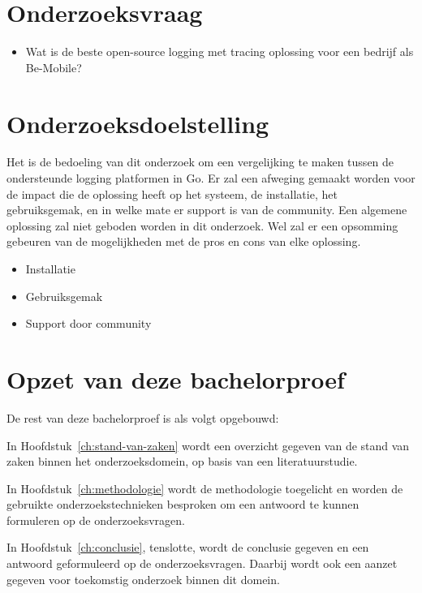 \section{Onderzoeksvraag}
\label{sec:onderzoeksvraag}

\begin{itemize}
    \item  Wat is de beste open-source logging met tracing oplossing voor een bedrijf als Be-Mobile?
\end{itemize}

\section{Onderzoeksdoelstelling}
\label{sec:onderzoeksdoelstelling}

Het is de bedoeling van dit onderzoek om een vergelijking te maken tussen de ondersteunde logging platformen in Go. Er zal een afweging gemaakt worden voor de impact die de oplossing heeft op het systeem, de installatie, het gebruiksgemak, en in welke mate er support is van de community. Een algemene oplossing zal niet geboden worden in dit onderzoek. Wel zal er een opsomming gebeuren van de mogelijkheden met de pros en cons van elke oplossing.

\begin{itemize}
    \item Installatie 
    \item Gebruiksgemak
    \item Support door community
\end{itemize}

\section{Opzet van deze bachelorproef}
\label{sec:opzet-bachelorproef}


De rest van deze bachelorproef is als volgt opgebouwd:

In Hoofdstuk~\ref{ch:stand-van-zaken} wordt een overzicht gegeven van de stand van zaken binnen het onderzoeksdomein, op basis van een literatuurstudie.

In Hoofdstuk~\ref{ch:methodologie} wordt de methodologie toegelicht en worden de gebruikte onderzoekstechnieken besproken om een antwoord te kunnen formuleren op de onderzoeksvragen.


In Hoofdstuk~\ref{ch:conclusie}, tenslotte, wordt de conclusie gegeven en een antwoord geformuleerd op de onderzoeksvragen. Daarbij wordt ook een aanzet gegeven voor toekomstig onderzoek binnen dit domein.

